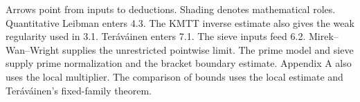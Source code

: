 \begin{center}
\smallskip
\parbox{0.91\linewidth}{\small\raggedright
Arrows point from inputs to deductions. Shading denotes mathematical roles.
Quantitative Leibman enters 4.3. The KMTT inverse estimate also
gives the weak regularity used in 3.1. Ter\'av\'ainen enters 7.1.
The sieve inputs feed 6.2.
Mirek--Wan--Wright supplies the unrestricted pointwise limit. The prime
model and sieve supply prime normalization and the bracket boundary estimate.
Appendix A also uses the local multiplier. The comparison of bounds
uses the local estimate and Ter\'av\'ainen's fixed-family theorem.}
\end{center}
